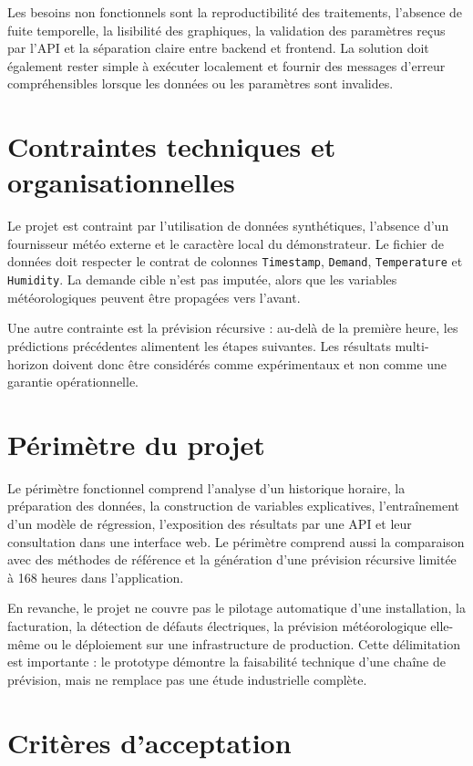 \documentclass[12pt,a4paper]{report}
\begin{document}
Les besoins non fonctionnels sont la reproductibilité des traitements,
l'absence de fuite temporelle, la lisibilité des graphiques, la validation des
paramètres reçus par l'API et la séparation claire entre backend et frontend.
La solution doit également rester simple à exécuter localement et fournir des
messages d'erreur compréhensibles lorsque les données ou les paramètres sont
invalides.

\section{Contraintes techniques et organisationnelles}

Le projet est contraint par l'utilisation de données synthétiques, l'absence
d'un fournisseur météo externe et le caractère local du démonstrateur. Le
	fichier de données doit respecter le contrat de colonnes \texttt{Timestamp},
\texttt{Demand}, \texttt{Temperature} et \texttt{Humidity}. La demande cible n'est pas imputée,
alors que les variables météorologiques peuvent être propagées vers l'avant.

Une autre contrainte est la prévision récursive : au-delà de la première
heure, les prédictions précédentes alimentent les étapes suivantes. Les
résultats multi-horizon doivent donc être considérés comme expérimentaux et
non comme une garantie opérationnelle.

\section{Périmètre du projet}

Le périmètre fonctionnel comprend l'analyse d'un historique horaire, la
préparation des données, la construction de variables explicatives,
l'entraînement d'un modèle de régression, l'exposition des résultats par une
API et leur consultation dans une interface web. Le périmètre comprend aussi
la comparaison avec des méthodes de référence et la génération d'une
prévision récursive limitée à 168 heures dans l'application.

En revanche, le projet ne couvre pas le pilotage automatique d'une
installation, la facturation, la détection de défauts électriques, la
prévision météorologique elle-même ou le déploiement sur une infrastructure
de production. Cette délimitation est importante : le prototype démontre la
faisabilité technique d'une chaîne de prévision, mais ne remplace pas une
étude industrielle complète.

\section{Critères d'acceptation}
\end{document}
